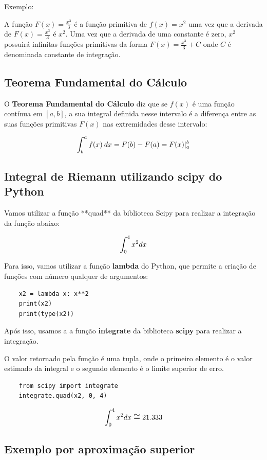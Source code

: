 Exemplo: 

A função $F(x) = \frac{x^3}{3}$ é a função primitiva de $f(x) = x^2$ uma vez que a derivada de $F(x) = \frac{x^3}{3}$ é $x^2$. Uma vez que a derivada de uma constante é zero, $x^2$ possuirá infinitas funções primitivas da forma $F(x) = \frac{x^3}{3} + C$ onde $C$ é denominada constante de integração.

\subsection{Teorema Fundamental do Cálculo}

O \textbf{Teorema Fundamental do Cálculo} diz que se $f(x)$ é uma função contínua em $[a,b]$, a sua integral definida nesse intervalo é a diferença entre as suas funções primitivas $F(x)$ nas extremidades desse intervalo:

\[\large \int_{b}^{a}f(x)\:dx = F(b) - F(a) = F(x)|^{b}_{a} \]

\subsection{Integral de Riemann utilizando scipy do Python}
Vamos utilizar a função **quad** da biblioteca Scipy para realizar a integração da função abaixo:

\[\large \int_{0}^{4}x^2dx\]

Para isso, vamos utilizar a função \textbf{lambda} do Python, que permite a criação de funções com número qualquer de argumentos:

\begin{verbatim}
	x2 = lambda x: x**2
	print(x2)
	print(type(x2))
\end{verbatim}

Após isso, usamos a a função \textbf{integrate} da biblioteca \textbf{scipy} para realizar a integração.

O valor retornado pela função é uma tupla, onde o primeiro elemento é o valor estimado da integral e o segundo elemento é o limite superior de erro.

\begin{verbatim}
	from scipy import integrate
	integrate.quad(x2, 0, 4)
\end{verbatim}

\[\large \int_{0}^{4}x^2dx \cong 21.333\]

\subsection{Exemplo por aproximação superior}

